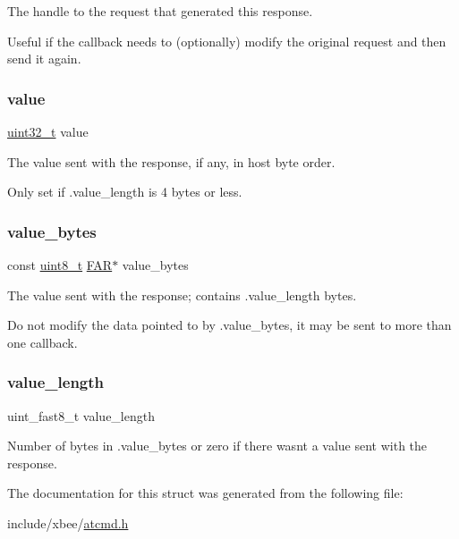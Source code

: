 The handle to the request that generated this response. 

Useful if the callback needs to (optionally) modify the original request and then send it again. \mbox{\label{structxbee__cmd__response__t_ae7f66047e6e39ba2bb6af8b95f00d1dd}} 
\subsubsection{\texorpdfstring{value}{value}}
{\footnotesize\ttfamily \hyperlink{group__hal__dos_ga09a1e304d66d35dd47daffee9731edaa}{uint32\+\_\+t} value}



The value sent with the response, if any, in host byte order. 

Only set if .value\+\_\+length is 4 bytes or less. \mbox{\label{structxbee__cmd__response__t_af6bfa5858cb10700bab8337ebdd26561}} 
\subsubsection{\texorpdfstring{value\+\_\+bytes}{value\_bytes}}
{\footnotesize\ttfamily const \hyperlink{group__hal__dos_gae1affc9ca37cfb624959c866a73f83c2}{uint8\+\_\+t} \hyperlink{group__hal_gaef060b3456fdcc093a7210a762d5f2ed}{F\+AR}$\ast$ value\+\_\+bytes}



The value sent with the response; contains .value\+\_\+length bytes. 

Do not modify the data pointed to by .value\+\_\+bytes, it may be sent to more than one callback. \mbox{\label{structxbee__cmd__response__t_a2c54a515e67816a5056c4526e22a91d9}} 
\subsubsection{\texorpdfstring{value\+\_\+length}{value\_length}}
{\footnotesize\ttfamily uint\+\_\+fast8\+\_\+t value\+\_\+length}



Number of bytes in .value\+\_\+bytes or zero if there wasn\textquotesingle{}t a value sent with the response. 



The documentation for this struct was generated from the following file\+:\begin{DoxyCompactItemize}
\item 
include/xbee/\hyperlink{atcmd_8h}{atcmd.\+h}\end{DoxyCompactItemize}
